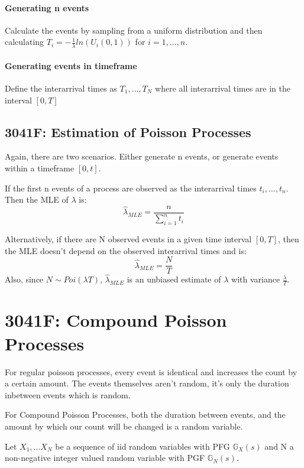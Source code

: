 \paragraph{Generating n events} Calculate the events by sampling from a uniform distribution and then calculating \(T_i = -\frac{1}{\lambda} ln(U_i(0,  1))\) for \(i = 1, \dots, n\). 
\paragraph{Generating events in timeframe} Define the interarrival times as \(T_1, \dots, 
T_N\) where all interarrival times are in the interval \([0, T]\)
\subsection{3041F: Estimation of Poisson Processes}
Again, there are two scenarios. Either generate n events, or generate events within a timeframe \([0, t]\).

If the first n events of a process are observed as the interarrival times \(t_i, \dots, t_n\). Then the MLE of \(\lambda\) is:
\begin{equation*}
    \hat{\lambda}_{MLE} = \frac{n}{\sum_{i=1}^{n}t_i}
\end{equation*}


Alternatively, if there are N observed events in a given time interval \([0, T]\), then the MLE doesn't depend on the observed interarrival times and is:
\begin{equation*}
    \hat{\lambda}_{MLE} = \frac{N}{T}
\end{equation*}
Also, since \(N \sim Poi(\lambda T)\), \(\hat{\lambda}_{MLE}\) is an unbiased estimate of 
\(\lambda\) with variance \(\frac{\lambda}{T}\).
\section{3041F: Compound Poisson Processes}
For regular poisson processes, every event is identical and increases the count
by a certain amount. The events themselves aren't random, it's only the
duration inbetween events which is random.

For Compound Poisson Processes, both the duration between events, and the
amount by which our count will be changed is a random variable.

Let \(X_1, \dots X_N\) be a sequence of iid random variables with PFG
\( \mathbb{G}_X(s)\) and N a non-negative integer valued random variable with PGF
\( \mathbb{G}_N(s)\).


